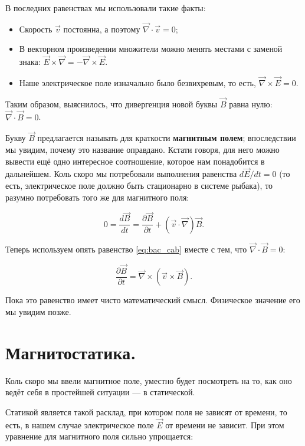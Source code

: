 \documentclass[a4paper,12pt]{article}
\numberwithin{equation}{section}
\newcommand{\pt}{\partial}
\newcommand{\vn}{\vec{\nabla}}
\begin{document}
В последних равенствах мы использовали такие факты: 

\begin{itemize}
\item Скорость $\vec{v}$ постоянна, а поэтому $\vn \cdot \vec{v} =0$;
\item В векторном произведении множители можно менять местами с
  заменой знака: $\vec{E} \times \vn = - \vn \times \vec{E}$.
\item Наше электрическое поле изначально было безвихревым, то есть,
  $\vn \times \vec{E}=0$.
\end{itemize}

Таким образом, выяснилось, что дивергенция новой буквы $\vec{B}$ равна
нулю: $\vn \cdot \vec{B}=0$.

Букву $\vec{B}$ предлагается называть для краткости \textbf{магнитным
  полем}; впоследствии мы увидим, почему это название
оправдано. Кстати говоря, для него можно вывести ещё одно интересное
соотношение, которое нам понадобится в дальнейшем. Коль скоро мы
потребовали выполнения равенства $d\vec{E}/dt=0$ (то есть, электрическое
поле должно быть стационарно в системе рыбака), то разумно потребовать
того же для магнитного поля:

\begin{equation}
  \label{eq:db/dt_1}
  0=\frac{d\vec{B}}{dt} = \frac{\pt \vec{B}}{\pt t} + \left( \vec{v}
    \cdot \vn \right) \vec{B}.
\end{equation}

Теперь используем опять равенство \eqref{eq:bac_cab} вместе с тем, что
$\vn \cdot \vec{B}=0$: 

\begin{equation}
  \label{eq:db/dt_2}
  \frac{\pt \vec{B}}{\pt t} = \vn \times \left( \vec{v} \times \vec{B}  \right).
\end{equation}

Пока это равенство имеет чисто математический смысл. Физическое
значение его мы увидим позже. 


\section{Магнитостатика.}
\label{sec:magnetostatics}

Коль скоро мы ввели магнитное поле, уместно будет посмотреть на то,
как оно ведёт себя в простейшей ситуации — в статической. 

Статикой является такой расклад, при котором поля не зависят от
времени, то есть, в нашем случае электрическое поле $\vec{E}$ от
времени не зависит. При этом уравнение для магнитного поля сильно
упрощается: 
\end{document}
